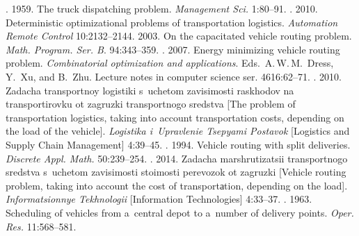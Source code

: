   \begin{multicols}{2}

\renewcommand{\bibname}{\protect\rmfamily References}



{\small\frenchspacing
 {%
 \begin{thebibliography}{9}
. 1959. The truck dispatching problem.
\textit{Management Sci.} 1:80--91.
. 2010. Deterministic optimizational
problems of transportation logistics. \textit{Automation Remote Control}
10:2132--2144.
 2003.
On the capacitated vehicle routing problem. \textit{Math. Program. Ser. B}.
94:343--359.
. 2007. Energy minimizing vehicle
routing problem. \textit{Combinatorial optimization and applications}.
Eds.\ A.\,W.\,M.~Dress, Y.~Xu, and B.~Zhu.
Lecture notes in computer science ser. 4616:62--71.
. 2010. Zadacha transportnoy logistiki s~uchetom zavisimosti raskhodov na transportirovku ot zagruzki transportnogo sredstva
[The problem of transportation logistics, taking into account transportation costs,
depending on the load of the vehicle]. \textit{Logistika i~Upravlenie Tsepyami
Postavok} [Logistics and Supply Chain Management] 4:39--45.
. 1994. Vehicle routing with split
deliveries. \textit{Discrete Appl. Math.} 50:239--254.
. 2014. Zadacha marsh\-ru\-ti\-za\-tsii
transportnogo sredstva s~uchetom zavisimosti stoimosti perevozok ot zagruzki
[Vehicle routing problem, taking into account the cost of transportаtion, depending
on the load]. \textit{Informatsionnye Tekhnologii} [Information Technologies]
4:33--37.
. 1963. Scheduling of vehicles from a~central
depot to a~number of delivery points. \textit{Oper. Res.} 11:568--581.
\end{thebibliography}

 }
 }

\end{multicols}

\vspace*{-6pt}

